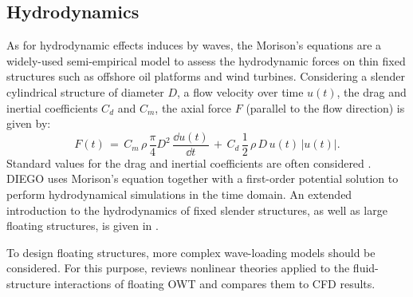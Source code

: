 

\subsection{Hydrodynamics}

As for hydrodynamic effects induces by waves, the Morison's equations are a widely-used semi-empirical model to assess the hydrodynamic forces on thin fixed structures such as offshore oil platforms and wind turbines. 
Considering a slender cylindrical structure of diameter $D$, a flow velocity over time $u(t)$, the drag and inertial coefficients $C_d$ and $C_m$, the axial force $F$ (parallel to the flow direction) is given by:   
\begin{equation}
    F(t)\,=\,C_{m}\,\rho \,{\frac {\pi }{4}}D^{2}\,{\frac{\dd u(t)}{\dd t}}\,+\,C_{d}\,{\frac 12}\,\rho \,D\,u(t)\,|u(t)|.
\end{equation}
Standard values for the drag and inertial coefficients are often considered \citep{dnv_2013_offshore_design}. 
DIEGO uses Morison's equation together with a first-order potential solution to perform hydrodynamical simulations in the time domain.
An extended introduction to the hydrodynamics of fixed slender structures, as well as large floating structures, is given in \citep[Chap. 1]{milano_thesis_2021}.  

To design floating structures, more complex wave-loading models should be considered. 
For this purpose, \citet{ronge_2023_hydrodynamics_fowt} reviews nonlinear theories applied to the fluid-structure interactions of floating OWT and compares them to CFD results. 


